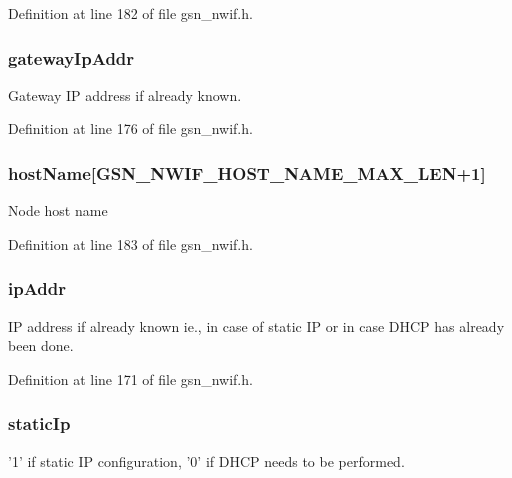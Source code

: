 Definition at line 182 of file gsn\_\-nwif.h.

\hypertarget{a00170_acce916feccd51bb2f497d83520f0dead}{
\subsubsection[{gatewayIpAddr}]{ {\bf gatewayIpAddr}}}
\label{a00170_acce916feccd51bb2f497d83520f0dead}
Gateway IP address if already known. 

Definition at line 176 of file gsn\_\-nwif.h.

\hypertarget{a00170_a0379c17037072ed631bd2efd42722f2c}{
\subsubsection[{hostName}]{ {\bf hostName}\mbox{[}GSN\_\-NWIF\_\-HOST\_\-NAME\_\-MAX\_\-LEN+1\mbox{]}}}
\label{a00170_a0379c17037072ed631bd2efd42722f2c}
Node host name 

Definition at line 183 of file gsn\_\-nwif.h.

\hypertarget{a00170_a48e99cad0feadbd616a0cda7d9628826}{
\subsubsection[{ipAddr}]{ {\bf ipAddr}}}
\label{a00170_a48e99cad0feadbd616a0cda7d9628826}
IP address if already known ie., in case of static IP or in case DHCP has already been done. 

Definition at line 171 of file gsn\_\-nwif.h.

\hypertarget{a00170_a3645e8aceeda8be734506deae9b16aae}{
\subsubsection[{staticIp}]{ {\bf staticIp}}}
\label{a00170_a3645e8aceeda8be734506deae9b16aae}
'1' if static IP configuration, '0' if DHCP needs to be performed. 

